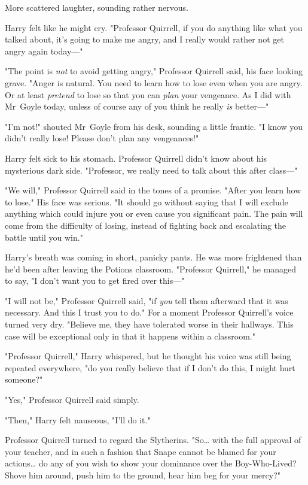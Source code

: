 More scattered laughter, sounding rather nervous.

Harry felt like he might cry. "Professor Quirrell, if you do anything like what
you talked about, it's going to make me angry, and I really would rather not
get angry again today---"

"The point is \emph{not} to avoid getting angry," Professor Quirrell said, his
face looking grave. "Anger is natural. You need to learn how to lose even when
you are angry. Or at least \emph{pretend} to lose so that you can \emph{plan}
your vengeance. As I did with Mr~Goyle today, unless of course any of you
think he really \emph{is} better---"

"I'm not!" shouted Mr~Goyle from his desk, sounding a little frantic. "I know
you didn't really lose! Please don't plan any vengeances!"

Harry felt sick to his stomach. Professor Quirrell didn't know about his
mysterious dark side. "Professor, we really need to talk about this after
class---"

"We will," Professor Quirrell said in the tones of a promise. "After you learn
how to lose." His face was serious. "It should go without saying that I will
exclude anything which could injure you or even cause you significant pain. The
pain will come from the difficulty of losing, instead of fighting back and
escalating the battle until you win."

Harry's breath was coming in short, panicky pants. He was more frightened than
he'd been after leaving the Potions classroom. "Professor Quirrell," he managed
to say, "I don't want you to get fired over this---"

"I will not be," Professor Quirrell said, "if \emph{you} tell them afterward
that it was necessary. And this I trust you to do." For a moment Professor
Quirrell's voice turned very dry. "Believe me, they have tolerated worse in
their hallways. This case will be exceptional only in that it happens within a
classroom."

"Professor Quirrell," Harry whispered, but he thought his voice was still being
repeated everywhere, "do you really believe that if I don't do this, I might
hurt someone?"

"Yes," Professor Quirrell said simply.

"Then," Harry felt nauseous, "I'll do it."

Professor Quirrell turned to regard the Slytherins. "So{\ldots} with the full
approval of your teacher, and in such a fashion that Snape cannot be blamed for
your actions{\ldots} do any of you wish to show your dominance over the
Boy-Who-Lived? Shove him around, push him to the ground, hear him beg for your
mercy?"

